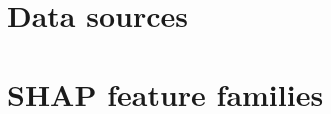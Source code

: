 \documentclass[final]{agujournal2025}
\begin{document}

\appendix  %

\newpage
\section{Data sources}\label{appx:data-sources}

\clearpage

\newpage
\section{SHAP feature families}\label{appx:feature-families}

\clearpage
\end{document}

